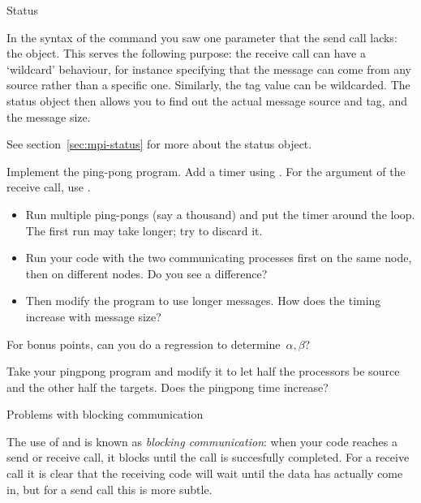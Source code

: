  {Status}

In the syntax of the  command you saw one parameter that
the send call lacks: the  object. This serves the following
purpose: the receive call can have a `wildcard' behaviour, for instance specifying
that the message can come from any source rather than a specific
one. Similarly, the tag value can be wildcarded. The status
object then allows you to find out the actual message source and tag,
and the message size.

See section~\ref{sec:mpi-status}
for more about the status object.

\begin{exercise}
  \label{ex:pingpong}
  Implement the ping-pong program. Add a timer using .
  For the  argument of the receive call, use
  .

  \begin{itemize}
  \item Run multiple ping-pongs (say a thousand) and put the timer
    around the loop. The first run may take longer; try to discard it.
  \item Run your code with the two communicating processes first on
    the same node, then on different nodes. Do you see a difference?
  \item Then modify the program
    to use longer messages. How does the timing increase with message size?
  \end{itemize}
  For bonus points, can you do a regression to determine~$\alpha,\beta$?
\end{exercise}

\begin{exercise}
  \label{ex:hbwpingpong}
  Take your pingpong program and modify it 
  to let half the processors
  be source and the other half the targets. Does the pingpong time increase?
\end{exercise}

 {Problems with blocking communication}
\label{sec:blocking}

The use of  and 
is known as \emph{blocking communication}: when your code reaches a
send or receive call, it blocks until the call is succesfully completed.
For a receive call it is clear that the receiving code will wait until
the data has actually come in, but for a send call this is more subtle.

